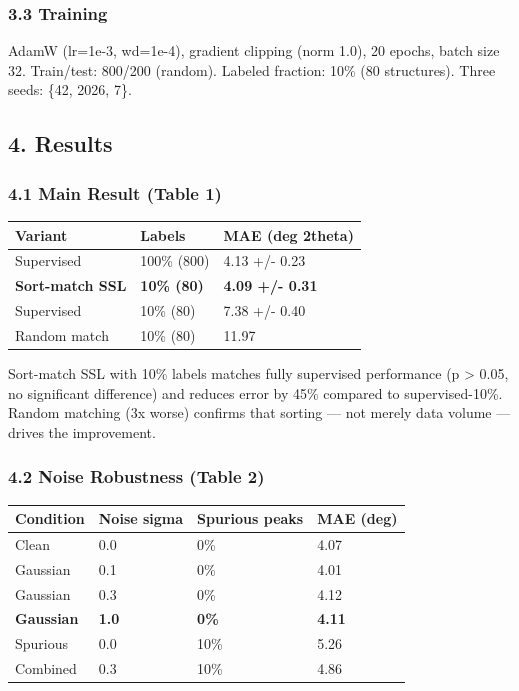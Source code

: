 \documentclass[
  11pt,
]{article}
\newcounter{none} %
\begin{document}
\subsubsection{3.3 Training}\label{training}

AdamW (lr=1e-3, wd=1e-4), gradient clipping (norm 1.0), 20 epochs, batch
size 32. Train/test: 800/200 (random). Labeled fraction: 10\% (80
structures). Three seeds: \{42, 2026, 7\}.

\subsection{4. Results}\label{results}

\subsubsection{4.1 Main Result (Table 1)}\label{main-result-table-1}

{\def\LTcaptype{none} %
\begin{longtable}[]{@{}lll@{}}
\toprule\noalign{}
Variant & Labels & MAE (deg 2theta) \\
\midrule\noalign{}
\endhead
\bottomrule\noalign{}
\endlastfoot
Supervised & 100\% (800) & 4.13 +/- 0.23 \\
\textbf{Sort-match SSL} & \textbf{10\% (80)} & \textbf{4.09 +/- 0.31} \\
Supervised & 10\% (80) & 7.38 +/- 0.40 \\
Random match & 10\% (80) & 11.97 \\
\end{longtable}
}

Sort-match SSL with 10\% labels matches fully supervised performance (p
\textgreater{} 0.05, no significant difference) and reduces error by
45\% compared to supervised-10\%. Random matching (3x worse) confirms
that sorting --- not merely data volume --- drives the improvement.

\subsubsection{4.2 Noise Robustness (Table
2)}\label{noise-robustness-table-2}

{\def\LTcaptype{none} %
\begin{longtable}[]{@{}llll@{}}
\toprule\noalign{}
Condition & Noise sigma & Spurious peaks & MAE (deg) \\
\midrule\noalign{}
\endhead
\bottomrule\noalign{}
\endlastfoot
Clean & 0.0 & 0\% & 4.07 \\
Gaussian & 0.1 & 0\% & 4.01 \\
Gaussian & 0.3 & 0\% & 4.12 \\
\textbf{Gaussian} & \textbf{1.0} & \textbf{0\%} & \textbf{4.11} \\
Spurious & 0.0 & 10\% & 5.26 \\
Combined & 0.3 & 10\% & 4.86 \\
\end{longtable}
}
\end{document}
